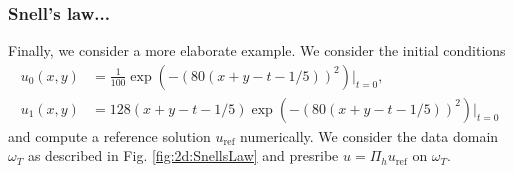\documentclass[sn-mathphys-num]{sn-jnl}
\numberwithin{equation}{section}
\begin{document}
\begin{comment}
  \begin{figure}[!htbp]
    \begin{center}
        \begin{tikzpicture}[scale=0.72]
            \begin{groupplot}[%
                group style={%
                group size=1 by 1,
                horizontal sep=1.5cm,
                vertical sep=2cm,
                },0m,domain=1:4,xmode=linear,ymode=log, xlabel={}, ylabel={}, title={$\Vert u_0 - u_h \vert_{t = 0} \Vert_{H^1(\Omega)} + \Vert \partial_t (u - u_h) \vert_{t = 0} \Vert_{L^2(\Omega)}$}, %
                legend pos=south east, %
                ]
                \addplot+[discard if not={order}{2},discard if not={L}{3},line width=1.1pt] table [x=contrast, y=H1-dt-at-t-0, col sep=comma] {../../wave_data_assimilation/data/jumpCoefs/2D_errors_simpleRefsol_noGCC2_Restricted.csv};
                \addplot+[discard if not={order}{2},discard if not={L}{3},line width=1.1pt,dashed] table [x=contrast, y=bestapprox-H1-dt-at-t-0, col sep=comma] {../../wave_data_assimilation/data/0

                \addplot[gray, dashed, domain=1:4] {1*(1/2^(-2))^(x-0.9)};
                \addplot[gray, dashed, domain=1:4] {1*(1/2^(-1))^(x-0.9)};
                
    
                \legend{$k=2$, best, $e^\Lambda$ (rescaled)}
            
            \end{groupplot}
        \end{tikzpicture}
    \end{center}
    \caption{Filippas lambda... (2D), noGCC}
  \end{figure}
\end{comment}

\subsubsection{Snell's law... }
\noindent Finally, we consider a more elaborate example. We consider the initial conditions 
\begin{align*}
    u_0 (x,y) &= \frac{1}{100} \exp(-(80(x+y-t-1/5))^2) \vert_{t=0}, \\
    u_1(x,y) &= 128(x+y-t-1/5) \exp(-(80(x+y-t-1/5))^2) \vert_{t = 0}
\end{align*}
and compute a reference solution $u_{\text{ref}}$ numerically. We consider the data domain $\omega_T$ as described in Fig. \ref{fig:2d:SnellsLaw} and presribe $u = \Pi_h u_{\text{ref}}$ on $\omega_T$. 
\end{document}
